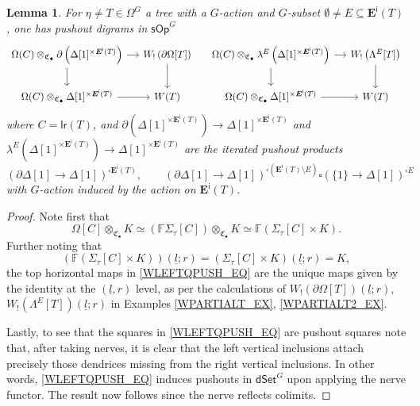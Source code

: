\documentclass[a4paper,10pt
,draft
]{article}%
\numberwithin{equation}{section}
\numberwithin{figure}{section}
\newtheorem{lemma}[equation]{Lemma}%
\theoremstyle{definition} %
\newcommand{\sOp}{\ensuremath{\mathsf{sOp}}}%
\newcommand{\1}{\ensuremath{\mathbbm 1}}%
\begin{document}
\begin{lemma}\label{WLEFTQPUSH LEM}
      For $\eta \neq T \in \Omega^G$
      a tree with a $G$-action
      and $G$-subset $\emptyset \neq E \subseteq \boldsymbol{E}^{\mathsf{i}}(T)$,
      one has pushout digrams in $\sOp^G$
\begin{equation}\label{WLEFTQPUSH_EQ}
\begin{tikzcd}[column sep = small]
	\Omega(C) \otimes_{\mathfrak C_\bullet}
	\partial \left(\Delta[1]^{\times \boldsymbol{E}^{\mathsf{i}}(T)}\right)
	\ar{r} \ar{d}
&
	W_! \left(\partial \Omega[T]\right) 
	\arrow[d]
& %
	\Omega(C) \otimes_{\mathfrak C_\bullet}
	\lambda^E \left(
	\Delta[1]^{\times \boldsymbol{E}^{\mathsf{i}}(T)}
	\right)
	\ar{r} \ar{d}
&
	W_! \left(\Lambda^E[T]\right) 
	\arrow[d]
\\
	\Omega(C) \otimes_{\mathfrak C_\bullet}
	\Delta[1]^{\times \boldsymbol{E}^{\mathsf{i}}(T)}
	\ar{r}
&
	W(T)
& %
	\Omega(C) \otimes_{\mathfrak C_\bullet}
	\Delta[1]^{\times \boldsymbol{E}^{\mathsf{i}}(T)}
	\ar{r}
&
	W(T)
\end{tikzcd}
\end{equation}
      where
      $C = \mathsf{lr}(T)$, and
      $\partial \left(\Delta[1]^{\times \boldsymbol{E}^{\mathsf{i}}(T)}\right)
      \to
      \Delta[1]^{\times \boldsymbol{E}^{\mathsf{i}}(T)}$
      and
      $\lambda^E
      \left(
      \Delta[1]^{\times \boldsymbol{E}^{\mathsf{i}}(T)}
      \right)
      \to \Delta[1]^{\times \boldsymbol{E}^{\mathsf{i}}(T)}$
      are the iterated pushout products
\[
	\left(
	\partial\Delta[1] \to \Delta[1]
	\right)^{\square \boldsymbol E^{\mathsf{i}}(T)},
\qquad
	\left(
	\partial \Delta[1] \to \Delta[1]
	\right)^{\square (\boldsymbol{E}^{\mathsf{i}}(T) \setminus E)}
	\square
	\left(
	\{1\} \to \Delta[1]
	\right)^{\square E}
\]
      with $G$-action induced by the action on $\boldsymbol{E}^{\mathsf{i}}(T)$.
\end{lemma}




\begin{proof}
	Note first that
\[\Omega[C] \otimes_{\mathfrak{C}_{\bullet}} K
\simeq
\left(
\mathbb{F} \Sigma_{\tau}[C]	
\right)	\otimes_{\mathfrak{C}_{\bullet}} K
\simeq
\mathbb{F} (\Sigma_{\tau}[C] \times K).\]
Further noting that
\[
\left(\mathbb{F} (\Sigma_{\tau}[C] \times K)\right)(\underline{l};r) =
(\Sigma_{\tau}[C] \times K)(\underline{l};r) = K,
\]
the top horizontal maps in 
\eqref{WLEFTQPUSH_EQ}
are the unique maps given by the identity at the 
$(\underline{l},r)$ level,
as per the calculations of
$W_!\left(\partial \Omega[T] \right)(\underline{l};r)$,
$W_!\left(\Lambda^E[T] \right)(\underline{l};r)$
in Examples \ref{WPARTIALT_EX}, \ref{WPARTIALT2_EX}.

Lastly, to see that the squares in
\eqref{WLEFTQPUSH_EQ} are pushout squares note that,
after taking nerves, it is clear that the left vertical inclusions attach precisely those dendrices 
missing from the right vertical inclusions.
In other words, \eqref{WLEFTQPUSH_EQ}
induces pushouts in $\mathsf{dSet}^G$ upon applying the nerve functor.
The result now follows since the nerve reflects colimits.
\end{proof}
\end{document}

